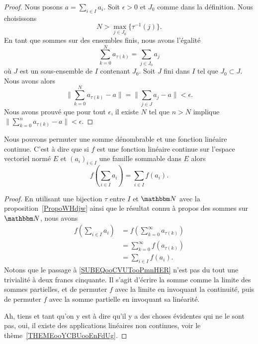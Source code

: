 \begin{proof}
    Nous posons \( a=\sum_{i\in I}a_i\). Soit \( \epsilon>0\) et \( J_0\) comme dans la définition. Nous choisissons
    \begin{equation}
        N>\max_{j\in J_0}\{ \tau^{-1}(j) \}.
    \end{equation}
    En tant que sommes sur des ensembles finis, nous avons l'égalité
    \begin{equation}
        \sum_{k=0}^Na_{\tau(k)}=\sum_{j\in J_0}a_j
    \end{equation}
    où \( J\) est un sous-ensemble de \( I\) contenant \( J_0\). Soit \( J\) fini dans \( I\) tel que \( J_0\subset J\). Nous avons alors
    \begin{equation}
        \| \sum_{k=0}^Na_{\tau(k)}-a \|=\| \sum_{j\in J}a_j-a \|<\epsilon.
    \end{equation}
    Nous avons prouvé que pour tout \( \epsilon\), il existe \( N\) tel que \( n>N\) implique \( \| \sum_{k=0}^na_{\tau(k)}-a\| <\epsilon\).
\end{proof}

\begin{corollary}
    Nous pouvons permuter une somme dénombrable et une fonction linéaire continue. C'est à dire que si \( f\) est une fonction linéaire continue sur l'espace vectoriel normé \( E\) et \( (a_i)_{i\in I}\) une famille sommable dans \( E\) alors
    \begin{equation}
        f\left( \sum_{i\in I}a_i \right)=\sum_{i\in I}f(a_i).
    \end{equation}
\end{corollary}

\begin{proof}
    En utilisant une bijection \( \tau\) entre \( I\) et \( \eN\) avec la proposition~\ref{PropoWHdjw} ainsi que le résultat connu à propos des sommes sur \( \eN\), nous avons
    \begin{subequations}
        \begin{align}
            f\left( \sum_{i\in I}a_i \right)&=f\left( \sum_{k=0}^{\infty}a_{\tau(k)} \right)\\
            &=\sum_{k=0}^{\infty}f(a_{\tau(k)}) \label{SUBEQooCVUTooPmnHER}\\
            &=\sum_{i\in I}f(a_i).
        \end{align}
    \end{subequations}
    Notons que le passage à \eqref{SUBEQooCVUTooPmnHER} n'est pas du tout une trivialité à deux francs cinquante. Il s'agit d'écrire la somme comme la limite des sommes partielles, et de permuter \( f\) avec la limite en invoquant la continuité, puis de permuter \( f\) avec la somme partielle en invoquant sa linéarité.

    Ah, tiens et tant qu'on y est à dire qu'il y a des choses évidentes qui ne le sont pas, oui, il existe des applications linéaires non continues, voir le thème~\ref{THEMEooYCBUooEnFdUg}.
\end{proof}

